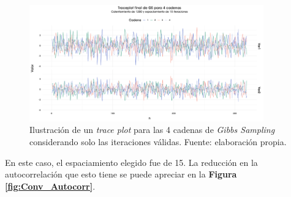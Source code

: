 \begin{figure}[h]
	\centering
	\includegraphics[width=0.9\textwidth]{Figs/Bayes/Ejemplos_Convergencia_Traceplot_Final}
	\caption{Ilustración de un \textit{trace plot} para las 4 cadenas de \textit{Gibbs Sampling} considerando solo las iteraciones válidas. Fuente: elaboración propia.}
	\label{fig:Conv_Prom_Erg}	
\end{figure}

En este caso, el espaciamiento elegido fue de 15. La reducción en la autocorrelación que esto tiene se puede apreciar en la \textbf{Figura \ref{fig:Conv_Autocorr}}.

